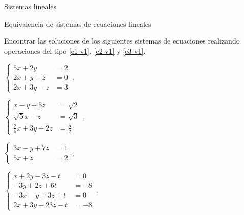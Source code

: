 \begin{chapter}{Sistemas lineales}
\begin{section}{Equivalencia de sistemas de ecuaciones lineales}
            \begin{enumex}
                \item Encontrar las soluciones de los siguientes sistemas de ecuaciones realizando operaciones del tipo \ref{e1-v1}, \ref{e2-v1} y \ref{e3-v1}.
                    \begin{enumex}
                        \begin{minipage}{0.4\textwidth}
                            \item $\begin{cases}
                                5x +2y&= 2 \\
                                 2x+y-z&=0 \\
                             2x+3y-z &= 3
                             \end{cases}$\,,
                        \end{minipage}
                        \begin{minipage}{0.4\textwidth}
                            \item $\begin{cases}
                                x -y + 5z&= \sqrt2 \\
                                 \sqrt5x+z&=\sqrt3 \\[.1cm]
                             \displaystyle\frac25x+3y+2z &= \displaystyle\frac52
                             \end{cases}$\,,
                        \end{minipage}
    
                        \begin{minipage}{0.4\textwidth}
                            \item $\begin{cases}
                                3x - y + 7z &=1 \\
                                5x +z &=2
                            \end{cases}$\,, 
                        \end{minipage}
                        \begin{minipage}{0.4\textwidth}
                            \item $\begin{cases}
                                x +2 y -3z -t &=0 \\
                                -3 y +2z +6t &=-8 \\
                                -3x - y +3z +t &=0 \\
                                2x +3 y +23z -t &=-8 
                            \end{cases}$\,. 
                        \end{minipage}
                    \end{enumex} 
            \end{enumex}


\end{section}
\end{chapter}
